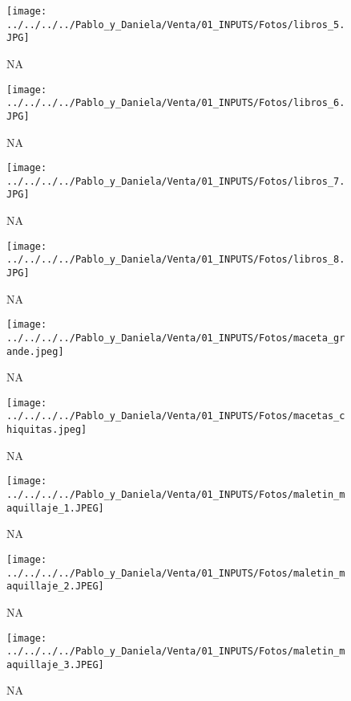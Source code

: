 \documentclass[
]{article}
\begin{document}
\pagebreak

\begin{figure}
\centering
\texttt{[image: ../../../../Pablo\_y\_Daniela/Venta/01\_INPUTS/Fotos/libros\_5.JPG]}
\caption{NA}
\end{figure}

\pagebreak

\begin{figure}
\centering
\texttt{[image: ../../../../Pablo\_y\_Daniela/Venta/01\_INPUTS/Fotos/libros\_6.JPG]}
\caption{NA}
\end{figure}

\pagebreak

\begin{figure}
\centering
\texttt{[image: ../../../../Pablo\_y\_Daniela/Venta/01\_INPUTS/Fotos/libros\_7.JPG]}
\caption{NA}
\end{figure}

\pagebreak

\begin{figure}
\centering
\texttt{[image: ../../../../Pablo\_y\_Daniela/Venta/01\_INPUTS/Fotos/libros\_8.JPG]}
\caption{NA}
\end{figure}

\pagebreak

\begin{figure}
\centering
\texttt{[image: ../../../../Pablo\_y\_Daniela/Venta/01\_INPUTS/Fotos/maceta\_grande.jpeg]}
\caption{NA}
\end{figure}

\pagebreak

\begin{figure}
\centering
\texttt{[image: ../../../../Pablo\_y\_Daniela/Venta/01\_INPUTS/Fotos/macetas\_chiquitas.jpeg]}
\caption{NA}
\end{figure}

\pagebreak

\begin{figure}
\centering
\texttt{[image: ../../../../Pablo\_y\_Daniela/Venta/01\_INPUTS/Fotos/maletin\_maquillaje\_1.JPEG]}
\caption{NA}
\end{figure}

\pagebreak

\begin{figure}
\centering
\texttt{[image: ../../../../Pablo\_y\_Daniela/Venta/01\_INPUTS/Fotos/maletin\_maquillaje\_2.JPEG]}
\caption{NA}
\end{figure}

\pagebreak

\begin{figure}
\centering
\texttt{[image: ../../../../Pablo\_y\_Daniela/Venta/01\_INPUTS/Fotos/maletin\_maquillaje\_3.JPEG]}
\caption{NA}
\end{figure}
\end{document}
